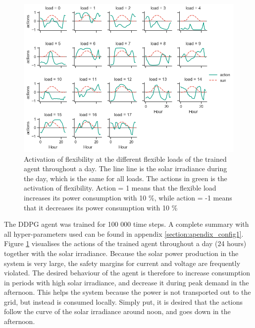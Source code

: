 \documentclass[class=book, crop=false]{standalone}
\begin{document}
\begin{figure}[h]
    \center
    \includegraphics[scale=0.7]{figures/configuration1.png}
    \caption[size = 9]{Activation of flexibility at the different flexible loads of the trained agent throughout a day. The line line is the solar irradiance during the day, which is the same for all loads. The actions in green is the activation of flexibility. Action = 1 means that the flexible load increases its power consumption with 10 \%, while action = -1 means that it decreases its power consumption with 10 \%}
    \label{fig:results:configuration1}
\end{figure}

The DDPG agent was trained for 100 000 time steps. A complete summary with all hyper-parameters used can be found in appendix \ref{section:apendix_config1}. Figure \ref{fig:results:configuration1} visualises the actions of the trained agent throughout a day (24 hours) together with the solar irradiance. Because the solar power production in the system is very large, the safety margins for current and voltage are frequently violated. The desired behaviour of the agent is therefore to increase consumption in periods with high solar irradiance, and decrease it during peak demand in the afternoon. This helps the system because the power is not transported out to the grid, but instead is consumed locally. Simply put, it is desired that the actions follow the curve of the solar irradiance around noon, and goes down in the afternoon. 
\end{document}
